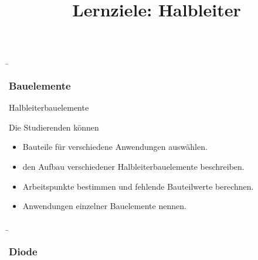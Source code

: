 \begin{frame}
    \b{ \frametitle{Bauelemente}
        \begin{Lernziele}{Halbleiterbauelemente}
            \title{Lernziele: Halbleiter}
            Die Studierenden können
            \begin{itemize}
                \item Bauteile für verschiedene Anwendungen auswählen.
                \item den Aufbau verschiedener Halbleiterbauelemente beschreiben.
                \item Arbeitspunkte bestimmen und fehlende Bauteilwerte berechnen. 
                \item Anwendungen einzelner Bauelemente nennen.
            \end{itemize}
        \end{Lernziele}  
    }
\end{frame}


\begin{frame}
    \b{\frametitle{Diode}
    \begin{figure}[H]
    \end{figure}
    }
\end{frame}

